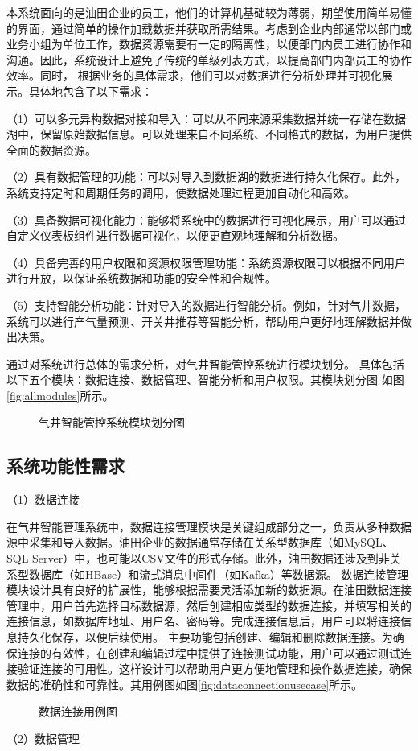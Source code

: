 本系统面向的是油田企业的员工，他们的计算机基础较为薄弱，期望使用简单易懂的界面，通过简单的操作加载数据并获取所需结果。考虑到企业内部通常以部门或业务小组为单位工作，数据资源需要有一定的隔离性，以便部门内员工进行协作和沟通。因此，系统设计上避免了传统的单级列表方式，以提高部门内部员工的协作效率。同时，
根据业务的具体需求，他们可以对数据进行分析处理并可视化展示。具体地包含了以下需求：

（1）可以多元异构数据对接和导入：可以从不同来源采集数据并统一存储在数据湖中，保留原始数据信息。可以处理来自不同系统、不同格式的数据，为用户提供全面的数据资源。

（2）具有数据管理的功能：可以对导入到数据湖的数据进行持久化保存。此外，系统支持定时和周期任务的调用，使数据处理过程更加自动化和高效。

（3）具备数据可视化能力：能够将系统中的数据进行可视化展示，用户可以通过自定义仪表板组件进行数据可视化，以便更直观地理解和分析数据。

（4）具备完善的用户权限和资源权限管理功能：系统资源权限可以根据不同用户进行开放，以保证系统数据和功能的安全性和合规性。

（5）支持智能分析功能：针对导入的数据进行智能分析。例如，针对气井数据，系统可以进行产气量预测、开关井推荐等智能分析，帮助用户更好地理解数据并做出决策。

通过对系统进行总体的需求分析，对气井智能管控系统进行模块划分。
具体包括以下五个模块：数据连接、数据管理、智能分析和用户权限。其模块划分图
如图\ref{fig:allmodules}所示。
\begin{figure}[H]
    \centering
    \caption{气井智能管控系统模块划分图}
\end{figure}
\subsection{系统功能性需求}
（1）数据连接

在气井智能管理系统中，数据连接管理模块是关键组成部分之一，负责从多种数据源中采集和导入数据。油田企业的数据通常存储在关系型数据库（如MySQL、SQL Server）中，也可能以CSV文件的形式存储。此外，油田数据还涉及到非关系型数据库（如HBase）和流式消息中间件（如Kafka）等数据源。
数据连接管理模块设计具有良好的扩展性，能够根据需要灵活添加新的数据源。在油田数据连接管理中，用户首先选择目标数据源，然后创建相应类型的数据连接，并填写相关的连接信息，如数据库地址、用户名、密码等。完成连接信息后，用户可以将连接信息持久化保存，以便后续使用。
主要功能包括创建、编辑和删除数据连接。为确保连接的有效性，在创建和编辑过程中提供了连接测试功能，用户可以通过测试连接验证连接的可用性。这样设计可以帮助用户更方便地管理和操作数据连接，确保数据的准确性和可靠性。其用例图如图\ref{fig:dataconnectionusecase}所示。
\begin{figure}[H]
    \centering
    \caption{数据连接用例图}
\end{figure}
（2）数据管理 

